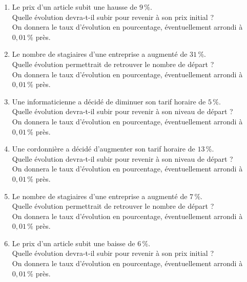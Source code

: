 {\begin{Exercice} %
\leavevmode\vspace{-\baselineskip}
\begin{enumerate}[itemsep=0.4em]
	\item \begin{minipage}[t]{\linewidth}Le prix d'un article subit une hausse de $9\,\%$.\\Quelle évolution devra-t-il subir pour revenir à son prix initial ?\\On donnera le taux d'évolution en pourcentage, éventuellement arrondi à $0,01\,\%$ près.\end{minipage}
	\item \begin{minipage}[t]{\linewidth}Le nombre de stagiaires d'une entreprise a augmenté de $31\,\%$.\\Quelle évolution permettrait de retrouver le nombre de départ ?\\On donnera le taux d'évolution en pourcentage, éventuellement arrondi à $0,01\,\%$ près.\end{minipage}
	\item \begin{minipage}[t]{\linewidth}Une informaticienne a décidé de diminuer son tarif horaire de $5\,\%$.\\Quelle évolution devra-t-il subir pour revenir à son niveau de départ ?\\On donnera le taux d'évolution en pourcentage, éventuellement arrondi à $0,01\,\%$ près.\end{minipage}
	\item \begin{minipage}[t]{\linewidth}Une cordonnière a décidé d'augmenter son tarif horaire de $13\,\%$.\\Quelle évolution devra-t-il subir pour revenir à son niveau de départ ?\\On donnera le taux d'évolution en pourcentage, éventuellement arrondi à $0,01\,\%$ près.\end{minipage}
	\item \begin{minipage}[t]{\linewidth}Le nombre de stagiaires d'une entreprise a augmenté de $7\,\%$.\\Quelle évolution permettrait de retrouver le nombre de départ ?\\On donnera le taux d'évolution en pourcentage, éventuellement arrondi à $0,01\,\%$ près.\end{minipage}
	\item \begin{minipage}[t]{\linewidth}Le prix d'un article subit une baisse de $6\,\%$.\\Quelle évolution devra-t-il subir pour revenir à son prix initial ?\\On donnera le taux d'évolution en pourcentage, éventuellement arrondi à $0,01\,\%$ près.\end{minipage}

\end{enumerate}
\end{Exercice}}
